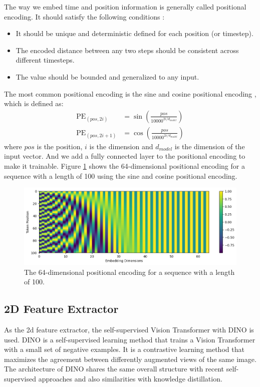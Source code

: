 \documentclass[12pt,DIV14,BCOR12mm,a4paper,footinclude=false,headinclude,parskip=half-,twoside,openright,cleardoublepage=empty,toc=index,bibliography=totoc,listof=totoc]{scrreprt}
\numberwithin{equation}{chapter}
\begin{document}
The way we embed time and position information is generally called positional encoding. It should satisfy the following conditions \cite{kazemnejad2019:pencoding}:
\begin{itemize}
  \item It should be unique and deterministic defined for each position (or timestep).
  \item The encoded distance between any two steps should be consistent across different timesteps.
  \item The value should be bounded and generalized to any input.
\end{itemize}
The most common positional encoding is the sine and cosine positional encoding \cite{vaswani2023attention}, which is defined as:
\begin{align}
  \text{PE}_{(pos, 2i)} &= \sin\left(\frac{pos}{10000^{2i/d_{model}}}\right)\\
  \text{PE}_{(pos, 2i+1)} &= \cos\left(\frac{pos}{10000^{2i/d_{model}}}\right)
\end{align}
where $pos$ is the position, $i$ is the dimension and $d_{model}$ is the dimension of the input vector. And we add a fully connected layer to the positional encoding to make it trainable. Figure \ref{img:pe} shows the 64-dimensional positional encoding for a sequence with a length of 100 using the sine and cosine positional encoding.
\begin{figure}[h]
	\centering
	\includegraphics[width=1.0\textwidth]{img/pe.png}
	\caption{The 64-dimensional positional encoding for a sequence with a length of 100.}
	\label{img:pe}
\end{figure}

\subsection{2D Feature Extractor}
As the \gls{2d} feature extractor, the self-supervised Vision Transformer
 with DINO \cite{caron2021emerging} is used. DINO is a self-supervised learning method that trains a Vision Transformer
 with a small set of negative examples. It is a contrastive learning method that maximizes the agreement between differently augmented views of the same image. The architecture of DINO shares the same overall structure with recent self-supervised approaches and also similarities with knowledge distillation.
\end{document}
